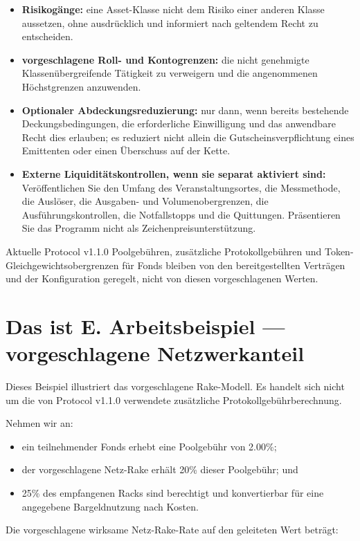\documentclass[11pt]{article}
\begin{document}
\begin{itemize}[leftmargin=*]
\item \textbf{Risikogänge:} eine Asset-Klasse nicht dem Risiko einer anderen Klasse aussetzen, ohne ausdrücklich und informiert nach geltendem Recht zu entscheiden.
\item \textbf{vorgeschlagene Roll- und Kontogrenzen:} die nicht genehmigte Klassenübergreifende Tätigkeit zu verweigern und die angenommenen Höchstgrenzen anzuwenden.
\item \textbf{Optionaler Abdeckungsreduzierung:} nur dann, wenn bereits bestehende Deckungsbedingungen, die erforderliche Einwilligung und das anwendbare Recht dies erlauben; es reduziert nicht allein die Gutscheinsverpflichtung eines Emittenten oder einen Überschuss auf der Kette.
\item \textbf{Externe Liquiditätskontrollen, wenn sie separat aktiviert sind:} Veröffentlichen Sie den Umfang des Veranstaltungsortes, die Messmethode, die Auslöser, die Ausgaben- und Volumenobergrenzen, die Ausführungskontrollen, die Notfallstopps und die Quittungen. Präsentieren Sie das Programm nicht als Zeichenpreisunterstützung.
\end{itemize}
Aktuelle Protocol v1.1.0 Poolgebühren, zusätzliche Protokollgebühren und Token-Gleichgewichtsobergrenzen für Fonds bleiben von den bereitgestellten Verträgen und der Konfiguration geregelt, nicht von diesen vorgeschlagenen Werten.


\section*{Das ist E. Arbeitsbeispiel --- vorgeschlagene Netzwerkanteil}

Dieses Beispiel illustriert das vorgeschlagene Rake-Modell. Es handelt sich nicht um die von Protocol v1.1.0 verwendete zusätzliche Protokollgebührberechnung.

Nehmen wir an:

\begin{itemize}[leftmargin=*]
\item ein teilnehmender Fonds erhebt eine Poolgebühr von 2.00\%;
\item der vorgeschlagene Netz-Rake erhält 20\% dieser Poolgebühr; und
\item 25\% des empfangenen Racks sind berechtigt und konvertierbar für eine angegebene Bargeldnutzung nach Kosten.
\end{itemize}
Die vorgeschlagene wirksame Netz-Rake-Rate auf den geleiteten Wert beträgt:
\end{document}
